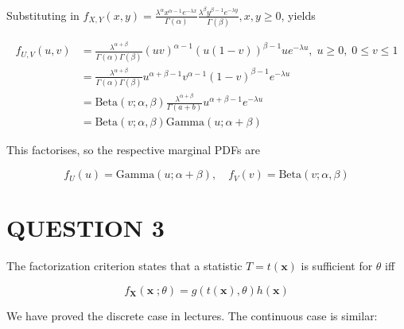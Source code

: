 \documentclass[a4paper]{article}
\begin{document}
	Substituting in $ f_{X,Y}(x,y) = \frac{\lambda^{\alpha} x^{\alpha - 1} e^{-\lambda x}}{\Gamma(\alpha)} \frac{\lambda^{\beta} y^{\beta - 1} e^{-\lambda y}}{\Gamma(\beta)}, x,y \geq 0  $, yields
	
	\begin{align*}
	f_{U,V}(u,v) & = \frac{\lambda^{\alpha + \beta}}{\Gamma(\alpha) \Gamma(\beta)} (uv)^{\alpha - 1}(u(1-v))^{\beta - 1}  u e^{-\lambda u}, \; u \geq 0, \;  0 \leq v \leq 1 \\
	& = \frac{\lambda^{\alpha + \beta}}{\Gamma(\alpha) \Gamma(\beta)} u^{\alpha + \beta - 1} v^{\alpha - 1} (1-v)^{\beta - 1} e^{-\lambda u} \\
	& = \text{Beta}(v ; \alpha,\beta) \frac{\lambda^{\alpha + \beta}}{\Gamma(a+b)} u^{\alpha + \beta - 1} e^{-\lambda u} \\
	& = \text{Beta}(v ; \alpha,\beta) \text{Gamma}(u ; \alpha + \beta)
	\end{align*}
	
	This factorises, so the respective marginal PDFs are
	
	\[ f_{U}(u) = \text{Gamma}(u ; \alpha + \beta), \quad f_{V}(v) = \text{Beta}(v ; \alpha,\beta)  \]

	
	



\section{QUESTION 3}

The factorization criterion states that a statistic $ T = t(\mathbf{x}) $ is sufficient for $ \theta $ iff 

\[ f_{\mathbf{X}}(\mathbf{x} \; ; \theta) = g(t(\mathbf{x}), \theta) h(\mathbf{x}) \]

We have proved the discrete case in lectures. The continuous case is similar:
\end{document}
